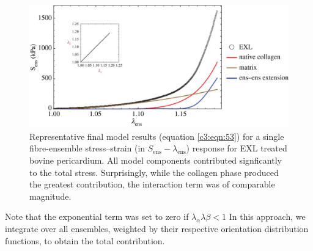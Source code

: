 \begin{figure}
\centering
\includegraphics[width=\textwidth]{Images/chapter3/F8large.jpg}
\caption{Representative final model results (equation \ref{c3:eqn:53}) for a single fibre-ensemble stress–strain (in $S_\mathrm{ens}-\lambda_\mathrm{ens}$) response for EXL treated bovine pericardium. All model components contributed signficantly to the total stress. Surprisingly, while the collagen phase produced the greatest contribution, the interaction term was of comparable magnitude. }
\label{c3:fig:8}
\end{figure}
    
    Note that the exponential term was set to zero if $\lambda_\alpha\lambda\beta<1$ In this approach, we integrate over all ensembles, weighted by their respective orientation distribution functions, to obtain the total contribution.
    
